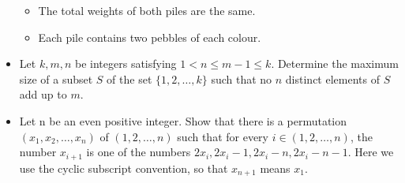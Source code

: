 \begin{itemize}
        \begin{itemize}
            \item 
            The total weights of both piles are the same.
            \item
                Each pile contains two pebbles of each colour.
        \end{itemize}
    \item Let $k, m, n$ be integers satisfying $1 < n \le m-1 \le k$. Determine 
        the maximum size of a subset $S$ of the set $\{1, 2, \ldots, k\}$ such that 
        no $n$ distinct elements of $S$ add up to $m$.
    \item Let n be an even positive integer. Show that there is a permutation 
        $(x_1, x_2, \ldots, x_n)$ of $(1, 2, \ldots, n)$ such that for every $i \in (1, 2, \ldots,
        n)$,
        the 
        number $x_{i+1}$ is one of the numbers $2x_i, 2x_i-1, 2x_i-n, 2x_i-n-1$. Here 
        we use the cyclic subscript convention, so that $x_{n+1}$ means $x_1$.  
\end{itemize}
